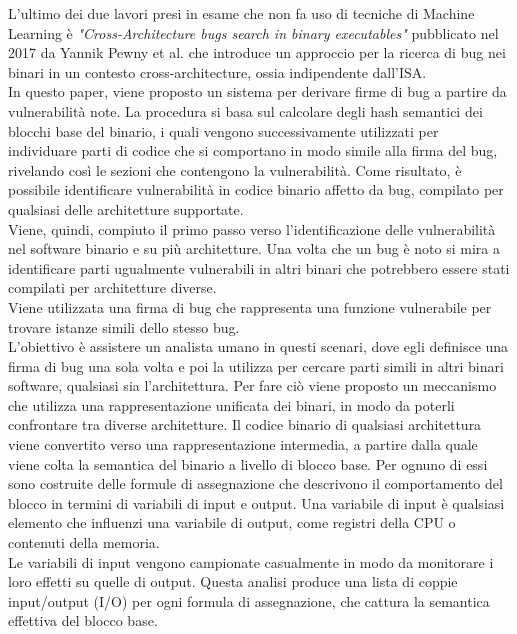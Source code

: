 \documentclass[12pt,a4paper,openright,twoside]{report}
\begin{document}
L’ultimo dei due lavori presi in esame che non fa uso di tecniche di Machine Learning è \textit{"Cross-Architecture bugs search in binary executables"} \cite{crossArchBugSearch} pubblicato nel 2017 da Yannik Pewny et al. che introduce un approccio per la ricerca di bug nei binari in un contesto cross-architecture, ossia indipendente dall’ISA.\\
In questo paper, viene proposto un sistema per derivare firme di bug a partire da vulnerabilità note. La procedura si basa sul calcolare degli hash semantici dei blocchi base del binario, i quali vengono successivamente utilizzati per individuare parti di codice che si comportano in modo simile alla firma del bug, rivelando così le sezioni che contengono la vulnerabilità. Come risultato, è possibile identificare vulnerabilità in codice binario affetto da bug, compilato per qualsiasi delle architetture supportate.\\
Viene, quindi, compiuto il primo passo verso l'identificazione delle vulnerabilità nel software binario e su più architetture. Una volta che un bug è noto si mira a identificare parti ugualmente vulnerabili in altri binari che potrebbero essere stati compilati per architetture diverse.\\
Viene utilizzata una firma di bug che rappresenta una funzione vulnerabile per trovare istanze simili dello stesso bug.\\
L'obiettivo è assistere un analista umano in questi scenari, dove egli definisce una firma di bug una sola volta e poi la utilizza per cercare parti simili in altri binari software, qualsiasi sia l'architettura. Per fare ciò viene proposto un meccanismo che utilizza una rappresentazione unificata dei binari, in modo da poterli confrontare tra diverse architetture. Il codice binario di qualsiasi architettura viene convertito verso una rappresentazione intermedia, a partire dalla quale viene colta la semantica del binario a livello di blocco base. Per ognuno di essi sono costruite delle formule di assegnazione che descrivono il comportamento del blocco in termini di variabili di input e output. Una variabile di input è qualsiasi elemento che influenzi una variabile di output, come registri della CPU o contenuti della memoria.\\
Le variabili di input vengono campionate casualmente in modo da monitorare i loro effetti su quelle di output. Questa analisi produce una lista di coppie input/output (I/O) per ogni formula di assegnazione, che cattura la semantica effettiva del blocco base.\\
\end{document}
